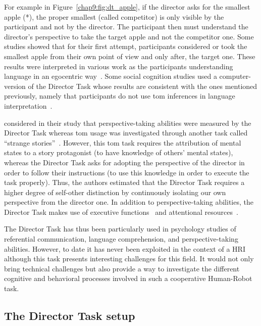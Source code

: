 \documentclass[a4paper,11pt,twoside]{StyleThese}
\begin{document}
For example in Figure~\ref{chap9:fig:dt_apple}, if the director asks for the smallest apple (*), the proper smallest (called competitor) is only visible by the participant and not by the director. The participant then must understand the director's perspective to take the target apple and not the competitor one. Some studies showed that for their first attempt, participants considered or took the smallest apple from their own point of view and only after, the target one. These results were interpreted in various work as the participants understanding language in an egocentric way~\citep{keysar_1994_illusory, keysar_1998_egocentric, keysar_2002_self, keysar_2003_limits}. 
Some social cognition studies used a computer-version of the Director Task whose results are consistent with the ones mentioned previously, namely that participants do not use \acrshort{tom} inferences in language interpretation~\citep{dumontheil_2010_online}.

\cite{santiesteban_2012_training} considered in their study that perspective-taking abilities were measured by the Director Task whereas \acrshort{tom} usage was investigated through another task called ``strange stories''~\citep{happe_1994_advanced}. However, this \acrshort{tom} task requires the attribution of mental states to a story protagonist (to have knowledge of others' mental states), whereas the Director Task asks for adopting the perspective of the director in order to follow their instructions (to use this knowledge in order to execute the task properly). Thus, the authors estimated that the Director Task requires a higher degree of self-other distinction by continuously isolating our own perspective from the director one. In addition to perspective-taking abilities, the Director Task makes use of executive functions~\citep{rubio_2017_director} and attentional resources~\citep{lin_2010_reflexively}.

The Director Task has thus been particularly used in psychology studies of referential communication, language comprehension, and perspective-taking abilities. However, to date it has never been exploited in the context of a HRI although this task presents interesting challenges for this field. It would not only bring technical challenges but also provide a way to investigate the different cognitive and behavioral processes involved in such a cooperative Human-Robot task.

\subsection{The Director Task setup}\label{chap9:subsec:material}
\end{document}
